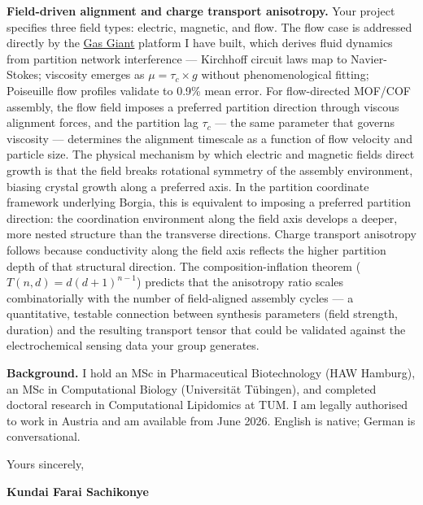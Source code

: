 \documentclass[12pt,a4paper]{article}
\begin{document}
\textbf{Field-driven alignment and charge transport anisotropy.}
Your project specifies three field types: electric, magnetic, and flow.
The flow case is addressed directly by the
\href{https://gas-giant.vercel.app/fluids}{Gas Giant} platform I have
built, which derives fluid dynamics from partition network interference ---
Kirchhoff circuit laws map to Navier-Stokes; viscosity emerges as
$\mu = \tau_c \times g$ without phenomenological fitting; Poiseuille flow
profiles validate to 0.9\% mean error.
For flow-directed MOF/COF assembly, the flow field imposes a preferred
partition direction through viscous alignment forces, and the partition
lag $\tau_c$ --- the same parameter that governs viscosity --- determines
the alignment timescale as a function of flow velocity and particle size.
The physical mechanism by which electric and magnetic fields direct growth is
that the field breaks rotational symmetry of the assembly environment,
biasing crystal growth along a preferred axis. In the partition coordinate
framework underlying Borgia, this is equivalent to imposing a preferred
partition direction: the coordination environment along the field axis
develops a deeper, more nested structure than the transverse directions.
Charge transport anisotropy follows because conductivity along the field
axis reflects the higher partition depth of that structural direction.
The composition-inflation theorem ($T(n,d) = d(d{+}1)^{n-1}$) predicts
that the anisotropy ratio scales combinatorially with the number of
field-aligned assembly cycles --- a quantitative, testable connection
between synthesis parameters (field strength, duration) and the resulting
transport tensor that could be validated against the electrochemical
sensing data your group generates.

\textbf{Background.}
I hold an MSc in Pharmaceutical Biotechnology (HAW Hamburg), an MSc in
Computational Biology (Universität Tübingen), and completed doctoral research
in Computational Lipidomics at TUM. I am legally authorised to work in Austria
and am available from June 2026. English is native; German is conversational.

\vspace{1.5em}
Yours sincerely,

\vspace{2.5em}
\textbf{Kundai Farai Sachikonye}
\end{document}
